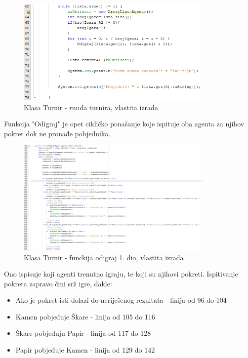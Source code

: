 \documentclass{foi}
\begin{document}
\begin{figure}[h!]
    \centering
    \includegraphics[width=0.85\textwidth]{slike/Screenshot_15.png}
    \caption{Klasa Turnir - runda turnira, vlastita izrada}
\end{figure}


\clearpage

Funkcija "Odigraj" je opet cikličko ponašanje koje ispituje oba agenta za njihov pokret dok ne pronađe pobjednika.

\begin{figure}[h!]
    \centering
    \includegraphics[width=0.85\textwidth]{slike/Screenshot_16.png}
    \caption{Klasa Turnir - funckija odigraj 1. dio, vlastita izrada}
\end{figure}

Ono ispisuje koji agenti trenutno igraju, te koji su njihovi pokreti.
Ispitivanje pokreta zapravo čini srž igre, dakle:

\begin{itemize}
    \item Ako je pokret isti dolazi do neriješenog rezultata - linija od 96 do 104 
    \item Kamen pobjeđuje Škare - linija od 105 do 116
    \item Škare pobjeđuju Papir - linija od 117 do 128
    \item Papir pobjeđuje Kamen - linija od 129 do 142
\end{itemize}
\end{document}
